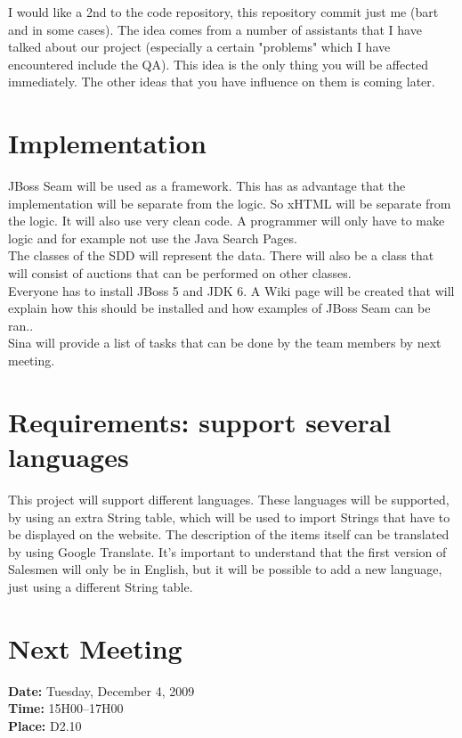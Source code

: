 \documentclass[a4paper, 12pt]{article}
\begin{document}
I would like a 2nd to the code repository, this repository commit just me (bart and in some cases).  The idea comes from a number of assistants that I have talked about our project (especially a certain "problems" which I have encountered include the QA). This idea is the only thing you will be affected immediately. The other ideas that you have influence on them is coming later.
	\section{Implementation}
JBoss Seam will be used as a framework. This has as advantage that the implementation will be separate from the logic. So xHTML will be separate from the logic. It will also use very clean code. A programmer will only have to make logic and for example not use the Java Search Pages. \\
The classes of the SDD will represent the data. There will also be a class that will consist of auctions that can be performed on other classes. \\
Everyone has to install JBoss 5 and JDK 6. A Wiki page will be created that will explain how this should be installed and how examples of JBoss Seam can be ran.\cite{site2}. \\
Sina will provide a list of tasks that can be done by the team members by next meeting.

	\section{Requirements: support several languages}
This project will support different languages. These languages will be supported, by using an extra String table, which will be used to import Strings that have to be displayed on the website. The description of the items itself can be translated by using Google Translate. It's important to understand that the first version of Salesmen will only be in English, but it will be possible to add a new language, just using a different String table.
	
	\section{Next Meeting}

		\textbf{Date:} Tuesday, December 4, 2009\\
		\textbf{Time:} 15H00--17H00\\
		\textbf{Place:} D2.10\\
	
\end{document}
